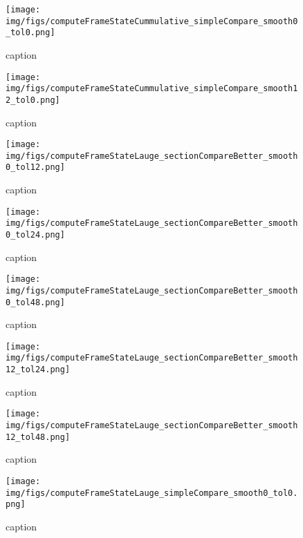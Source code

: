 %
\begin{figure}[!ht]
	\centering
	\texttt{[image: img/figs/computeFrameStateCummulative\_simpleCompare\_smooth0\_tol0.png]}
	\caption{caption}
	\label{fig:computeFrameStateCummulative_simpleCompare_smooth0_tol0.png}
\end{figure}
%
\begin{figure}[!ht]
	\centering
	\texttt{[image: img/figs/computeFrameStateCummulative\_simpleCompare\_smooth12\_tol0.png]}
	\caption{caption}
	\label{fig:computeFrameStateCummulative_simpleCompare_smooth12_tol0.png}
\end{figure}
%
\begin{figure}[!ht]
	\centering
	\texttt{[image: img/figs/computeFrameStateLauge\_sectionCompareBetter\_smooth0\_tol12.png]}
	\caption{caption}
	\label{fig:computeFrameStateLauge_sectionCompareBetter_smooth0_tol12.png}
\end{figure}
%
\begin{figure}[!ht]
	\centering
	\texttt{[image: img/figs/computeFrameStateLauge\_sectionCompareBetter\_smooth0\_tol24.png]}
	\caption{caption}
	\label{fig:computeFrameStateLauge_sectionCompareBetter_smooth0_tol24.png}
\end{figure}
%
\begin{figure}[!ht]
	\centering
	\texttt{[image: img/figs/computeFrameStateLauge\_sectionCompareBetter\_smooth0\_tol48.png]}
	\caption{caption}
	\label{fig:computeFrameStateLauge_sectionCompareBetter_smooth0_tol48.png}
\end{figure}
%
\begin{figure}[!ht]
	\centering
	\texttt{[image: img/figs/computeFrameStateLauge\_sectionCompareBetter\_smooth12\_tol24.png]}
	\caption{caption}
	\label{fig:computeFrameStateLauge_sectionCompareBetter_smooth12_tol24.png}
\end{figure}
%
\begin{figure}[!ht]
	\centering
	\texttt{[image: img/figs/computeFrameStateLauge\_sectionCompareBetter\_smooth12\_tol48.png]}
	\caption{caption}
	\label{fig:computeFrameStateLauge_sectionCompareBetter_smooth12_tol48.png}
\end{figure}
%
\begin{figure}[!ht]
	\centering
	\texttt{[image: img/figs/computeFrameStateLauge\_simpleCompare\_smooth0\_tol0.png]}
	\caption{caption}
	\label{fig:computeFrameStateLauge_simpleCompare_smooth0_tol0.png}
\end{figure}

